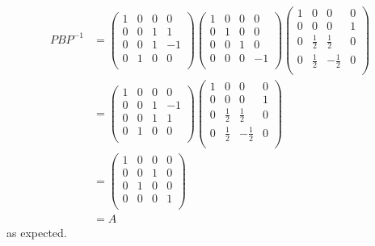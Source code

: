\documentclass{eh-homework}
\begin{document}
\begin{question}{4}
\begin{enumerate}[label=(\alph*)]
            \begin{align*}
                PBP^{-1} &=
                \begin{pmatrix}
                    1 & 0 & 0 & 0  \\
                    0 & 0 & 1 & 1  \\
                    0 & 0 & 1 & -1  \\
                    0 & 1 & 0 &  0 \\
                \end{pmatrix}
                \begin{pmatrix}
                    1 & 0 & 0 & 0  \\
                    0 & 1 & 0 & 0  \\
                    0 & 0 & 1 & 0  \\
                    0 & 0 & 0 & -1 \\
                \end{pmatrix}
                \begin{pmatrix}
                    1 & 0 & 0 & 0  \\
                    0 & 0 & 0 & 1  \\
                    0 & \frac{1}{2} & \frac{1}{2} & 0  \\
                    0 & \frac{1}{2} & -\frac{1}{2} & 0  \\
                \end{pmatrix} \\
                &= \begin{pmatrix}
                    1 & 0 & 0 &  0 \\
                    0 & 0 & 1 &  -1 \\
                    0 & 0 & 1 &  1 \\
                    0 & 1 & 0 &  0 \\
                \end{pmatrix}
                \begin{pmatrix}
                    1 & 0 & 0 & 0  \\
                    0 & 0 & 0 & 1  \\
                    0 & \frac{1}{2} & \frac{1}{2} & 0  \\
                    0 & \frac{1}{2} & -\frac{1}{2} & 0  \\
                \end{pmatrix} \\
                &=
                \begin{pmatrix}
                    1 & 0 & 0 &  0 \\
                    0 & 0 & 1 &  0 \\
                    0 & 1 & 0 &  0 \\
                    0 & 0 & 0 &  1 \\
                \end{pmatrix} \\
                &= A
            \end{align*}
            as expected.
        \end{enumerate}
    \end{question}
\end{document}
